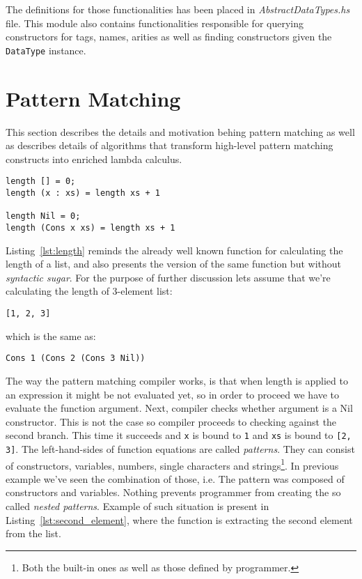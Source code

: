\documentclass[a4paper]{report}
\begin{document}
The definitions for those functionalities has been placed in
\textit{AbstractDataTypes.hs} file. This module also contains functionalities
responsible for querying constructors for tags, names, arities as well as
finding constructors given the \texttt{DataType} instance.


\section{Pattern Matching}
This section describes the details and motivation behing pattern matching as
well as describes details of algorithms that transform high-level pattern
matching constructs into enriched lambda calculus.

\begin{lstlisting}[label=lst:length,caption={Calculating length of list.}]
length [] = 0;
length (x : xs) = length xs + 1

length Nil = 0;
length (Cons x xs) = length xs + 1
\end{lstlisting}

Listing~\ref{lst:length} reminds the already well known function for
calculating the length of a list, and also presents the version of the same
function but without \textit{syntactic sugar}. For the purpose of further
discussion lets assume that we're calculating the length of 3-element list:

\begin{lstlisting}
[1, 2, 3]
\end{lstlisting}
which is the same as:
\begin{lstlisting}
Cons 1 (Cons 2 (Cons 3 Nil))
\end{lstlisting}

The way the pattern matching compiler works, is that when length is applied to
an expression it might be not evaluated yet, so in order to proceed we have to
evaluate the function argument. Next, compiler checks whether argument is a Nil
constructor. This is not the case so compiler proceeds to checking against the
second branch. This time it succeeds and \texttt{x} is bound to \texttt{1} and
\texttt{xs} is bound to \texttt{[2, 3]}. The left-hand-sides of function
equations are called \textit{patterns}. They can consist of constructors,
variables, numbers, single characters and strings\footnote{Both the built-in
ones as well as those defined by programmer.}. In previous example we've seen
the combination of those, i.e. The pattern was composed of constructors and
variables. Nothing prevents programmer from creating the so called
\textit{nested patterns}. Example of such situation is present in
Listing~\ref{lst:second_element}, where the function is extracting the second
element from the list.
\end{document}

